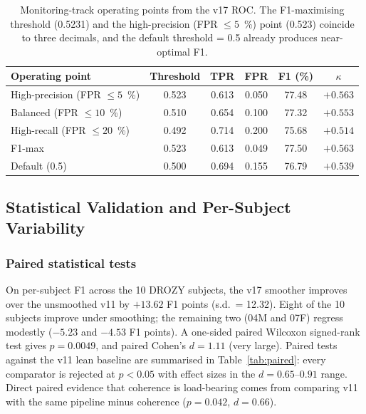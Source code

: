 \documentclass[journal]{IEEEtran}
\DeclareRobustCommand{\add}[1]{#1}                         %
\DeclareRobustCommand{\add}[1]{\hl{#1}}
\begin{document}
\begin{table}[t]
\caption{Monitoring-track operating points from the v17 ROC. The F1-maximising threshold (0.5231) and the high-precision (FPR \(\leq 5\)~\%) point (0.523) coincide to three decimals, and the default threshold = 0.5 already produces near-optimal F1.}
\label{tab:roc}
\centering
\footnotesize
\setlength{\tabcolsep}{4pt}
\begin{tabular}{l c c c c c}
\toprule
Operating point & Threshold & TPR & FPR & F1 (\%) & \(\kappa\) \\
\midrule
High-precision (FPR \(\leq 5\)~\%)  & 0.523 & 0.613 & 0.050 & 77.48 & \(+0.563\) \\
Balanced       (FPR \(\leq 10\)~\%) & 0.510 & 0.654 & 0.100 & 77.32 & \(+0.553\) \\
High-recall    (FPR \(\leq 20\)~\%) & 0.492 & 0.714 & 0.200 & 75.68 & \(+0.514\) \\
F1-max                              & 0.523 & 0.613 & 0.049 & 77.50 & \(+0.563\) \\
Default (0.5)                       & 0.500 & 0.694 & 0.155 & 76.79 & \(+0.539\) \\
\bottomrule
\end{tabular}
\end{table}

\subsection{\add{Statistical Validation and Per-Subject Variability}}
\label{sec:stats}

\subsubsection{Paired statistical tests}
\label{sec:paired}
On per-subject F1 across the 10 DROZY subjects, the v17 smoother improves over the unsmoothed v11 by \(+13.62\) F1 points (s.d.\ = 12.32). Eight of the 10 subjects improve under smoothing; the remaining two (04M and 07F) regress modestly (\(-5.23\) and \(-4.53\) F1 points). A one-sided paired Wilcoxon signed-rank test gives \(p = 0.0049\), and paired Cohen's \(d = 1.11\) (very large). Paired tests against the v11 lean baseline are summarised in Table~\ref{tab:paired}: every comparator is rejected at \(p < 0.05\) with effect sizes in the \(d = 0.65\)--\(0.91\) range. Direct paired evidence that coherence is load-bearing comes from comparing v11 with the same pipeline minus coherence (\(p = 0.042\), \(d = 0.66\)).
\end{document}
